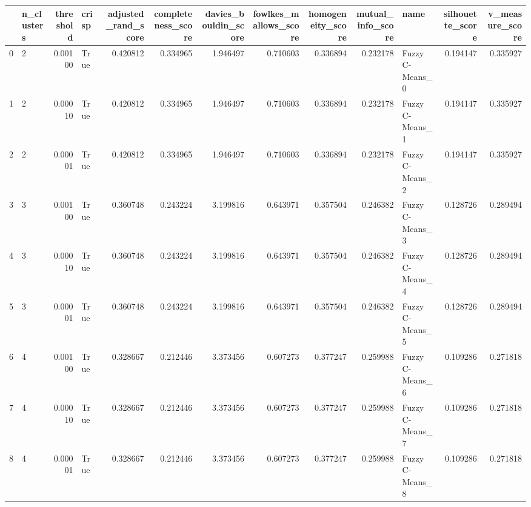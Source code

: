 \begin{tabular}{llrlrrrrrrlrr}
\toprule
{} & n\_clusters &  threshold & crisp &  adjusted\_rand\_score &  completeness\_score &  davies\_bouldin\_score &  fowlkes\_mallows\_score &  homogeneity\_score &  mutual\_info\_score &              name &  silhouette\_score &  v\_measure\_score \\
\midrule
0  &          2 &    0.00100 &  True &             0.420812 &            0.334965 &              1.946497 &               0.710603 &           0.336894 &           0.232178 &   Fuzzy C-Means\_0 &          0.194147 &         0.335927 \\
1  &          2 &    0.00010 &  True &             0.420812 &            0.334965 &              1.946497 &               0.710603 &           0.336894 &           0.232178 &   Fuzzy C-Means\_1 &          0.194147 &         0.335927 \\
2  &          2 &    0.00001 &  True &             0.420812 &            0.334965 &              1.946497 &               0.710603 &           0.336894 &           0.232178 &   Fuzzy C-Means\_2 &          0.194147 &         0.335927 \\
3  &          3 &    0.00100 &  True &             0.360748 &            0.243224 &              3.199816 &               0.643971 &           0.357504 &           0.246382 &   Fuzzy C-Means\_3 &          0.128726 &         0.289494 \\
4  &          3 &    0.00010 &  True &             0.360748 &            0.243224 &              3.199816 &               0.643971 &           0.357504 &           0.246382 &   Fuzzy C-Means\_4 &          0.128726 &         0.289494 \\
5  &          3 &    0.00001 &  True &             0.360748 &            0.243224 &              3.199816 &               0.643971 &           0.357504 &           0.246382 &   Fuzzy C-Means\_5 &          0.128726 &         0.289494 \\
6  &          4 &    0.00100 &  True &             0.328667 &            0.212446 &              3.373456 &               0.607273 &           0.377247 &           0.259988 &   Fuzzy C-Means\_6 &          0.109286 &         0.271818 \\
7  &          4 &    0.00010 &  True &             0.328667 &            0.212446 &              3.373456 &               0.607273 &           0.377247 &           0.259988 &   Fuzzy C-Means\_7 &          0.109286 &         0.271818 \\
8  &          4 &    0.00001 &  True &             0.328667 &            0.212446 &              3.373456 &               0.607273 &           0.377247 &           0.259988 &   Fuzzy C-Means\_8 &          0.109286 &         0.271818 \\

\end{tabular}
